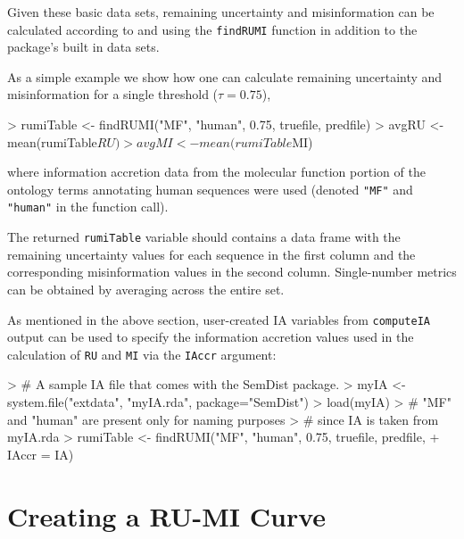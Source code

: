 \documentclass{article}
\begin{document}
Given these basic data sets, remaining uncertainty and misinformation can be calculated according to  and  using the \texttt{findRUMI} function in addition to the package's built in data sets. 


As a simple example we show how one can calculate remaining uncertainty and misinformation for a single threshold ($\tau =0.75$),

\begin{Schunk}
\begin{Sinput}
> rumiTable <- findRUMI("MF", "human", 0.75, truefile, predfile)
> avgRU <- mean(rumiTable$RU)
> avgMI <- mean(rumiTable$MI)
\end{Sinput}
\end{Schunk}

where information accretion data from the molecular function portion of the ontology terms annotating human sequences were used (denoted \texttt{"MF"} and \texttt{"human"} in the function call). 


The returned \texttt{rumiTable} variable should contains a data frame with the remaining uncertainty values for each sequence in the first column and the corresponding misinformation values in the second column. Single-number metrics can be obtained by averaging across the entire set.

As mentioned in the above section, user-created IA variables from \texttt{computeIA} output can be used to specify the information accretion values used in the calculation of \texttt{RU} and \texttt{MI} via the \texttt{IAccr} argument:

\begin{Schunk}
\begin{Sinput}
> # A sample IA file that comes with the SemDist package.
> myIA <- system.file("extdata", "myIA.rda", package="SemDist")
> load(myIA)
> # "MF" and "human" are present only for naming purposes
> # since IA is taken from myIA.rda
> rumiTable <- findRUMI("MF", "human", 0.75, truefile, predfile, 
+                         IAccr = IA)
\end{Sinput}
\end{Schunk}

\section{Creating a RU-MI Curve}
\end{document}
